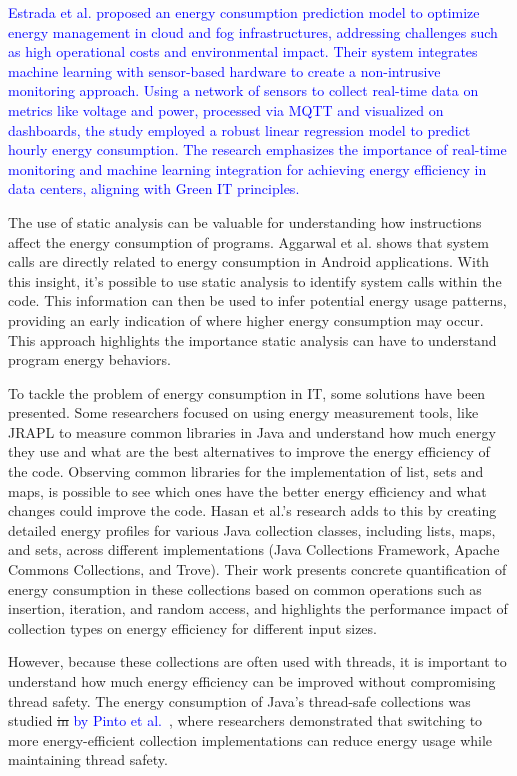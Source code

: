 \documentclass[sigplan]{acmart}
\newcommand{\wnote}[1]{\textcolor{blue}{#1}}
\begin{document}
\wnote{Estrada et al. \cite{estrada2022learning} proposed an energy consumption prediction model to optimize energy management in cloud and fog infrastructures, addressing challenges such as high operational costs and environmental impact. Their system integrates machine learning with sensor-based hardware to create a non-intrusive monitoring approach. Using a network of sensors to collect real-time data on metrics like voltage and power, processed via MQTT and visualized on dashboards, the study employed a robust linear regression model to predict hourly energy consumption. The research emphasizes the importance of real-time monitoring and machine learning integration for achieving energy efficiency in data centers, aligning with Green IT principles.}

The use of static analysis can be valuable for understanding how instructions affect the energy consumption of programs. Aggarwal et al. \cite{aggarwal2014power} shows that system calls are directly related to energy consumption in Android applications. With this insight, it's possible to use static analysis to identify system calls within the code. This information can then be used to infer potential energy usage patterns, providing an early indication of where higher energy consumption may occur. This approach highlights the importance static analysis can have to understand program energy behaviors.

To tackle the problem of energy consumption in IT, some solutions have been presented. Some researchers focused on using energy measurement tools, like JRAPL to measure common libraries in Java and understand how much energy they use and what are the best alternatives to improve the energy efficiency of the code\cite{10.1145/2896967.2896968}. Observing common libraries for the implementation of list, sets and maps, is possible to see which ones have the better energy efficiency and what changes could improve the code.
Hasan et al.'s \cite{10.1145/2884781.2884869} research adds to this by creating detailed energy profiles for various Java collection classes, including lists, maps, and sets, across different implementations (Java Collections Framework, Apache Commons Collections, and Trove). Their work presents concrete quantification of energy consumption in these collections based on common operations such as insertion, iteration, and random access, and highlights the performance impact of collection types on energy efficiency for different input sizes.

However, because these collections are often used with threads, it is important to understand how much energy efficiency can be improved without compromising thread safety. The energy consumption of Java's thread-safe collections was studied \st{in} \wnote{by Pinto et al.}~\cite{7816451}, where researchers demonstrated that switching to more energy-efficient collection implementations can reduce energy usage while maintaining thread safety.
\end{document}
